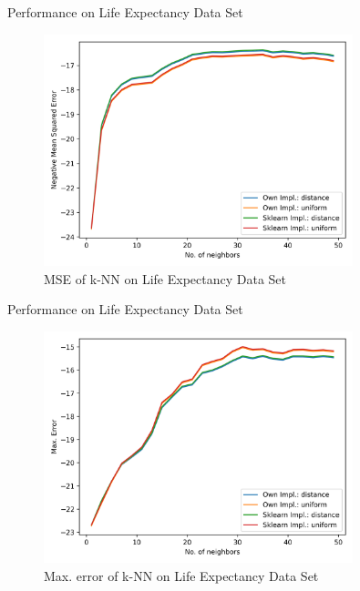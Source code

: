 \documentclass[10pt]{beamer}
\begin{document}
    \begin{frame}{Performance on Life Expectancy Data Set}
        \begin{figure}[h!]
            \centering
            \includegraphics[width=0.8\textwidth]{exercise_2/presentation/figures/le_knn_scores_mean_sq_err.png}
            \caption{MSE of k-NN on Life Expectancy Data Set}
            \label{fig:kNN_LE_MSE}
        \end{figure}    
    \end{frame}
    
    \begin{frame}{Performance on Life Expectancy Data Set}
        \begin{figure}[h!]
            \centering
            \includegraphics[width=0.8\textwidth]{exercise_2/presentation/figures/le_knn_scores_max_error.png}
            \caption{Max. error of k-NN on Life Expectancy Data Set}
            \label{fig:kNN_LE_max-error}
        \end{figure}    
    \end{frame}
        
\end{document}
